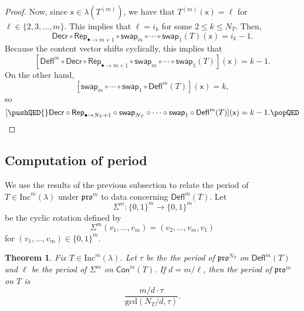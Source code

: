 \documentclass[12pt]{amsart}
\newcommand{\x}{\ensuremath{\mathsf{x}}}
\newtheorem{theorem}{Theorem}[section]
\theoremstyle{definition}
\theoremstyle{remark}
\numberwithin{equation}{section}
\newcommand{\inc}{\ensuremath{\mathrm{Inc}}}
\newcommand{\pro}{\mathfrak{pro}}
\newcommand{\swap}{\ensuremath{\mathsf{swap}}}
\newcommand{\decr}{\ensuremath{\mathsf{Decr}}}
\newcommand{\rep}{\ensuremath{\mathsf{Rep}}}
\newcommand{\deflate}{\ensuremath{\mathsf{Defl}}}
\newcommand{\content}{\ensuremath{\mathsf{Con}}}
\begin{document}
\begin{proof}
Now, since $\x \in \lambda(T^{(m)})$, we have that $T^{(m)}(\x) = \ell$ for $\ell \in \{2,3,\dots,m\}$. This implies that $\ell = i_k$ for some $2 \leq k \leq N_T$. Then, 
\[
\decr \circ \rep_{\bullet \to m+1} \circ \swap_m \circ \cdots \circ \swap_1 (T)(\x) = i_k-1.
\]
Because the content vector shifts cyclically, this implies that 
 \[
 [\deflate^m \circ \decr \circ \rep_{\bullet \rightarrow m+1} \circ \swap_m \circ \cdots \circ \swap_1 (T)](\x) = k-1.
 \]
  On the other hand, 
  \[
  [\swap_m \circ \cdots \circ \swap_1 \circ \deflate^m(T)](\x) = k,
  \]
   so 
   \[
   [ \pushQED{\qed} \decr \circ \rep_{\bullet \rightarrow N_T + 1} \circ \swap_{N_T} \circ \cdots \circ \swap_1 \circ  \deflate^m(T)](\x) = k-1. \qedhere \popQED \] \let\qed\relax
\end{proof}

\subsection{Computation of period}\label{sec:period} We use the results of the previous subsection to relate the period of $T \in \inc^m(\lambda)$ under $\pro^m$ to data concerning $\deflate^m(T)$. Let 
\[\Sigma^m : \lbrace 0,1\rbrace^m \rightarrow \lbrace 0,1\rbrace^m\]
 be the cyclic rotation defined by 
 \[
 \Sigma^m(v_1, \dots, v_m) = (v_2, \dots, v_m, v_1)
 \]
  for $(v_1, \dots, v_m) \in \lbrace 0,1 \rbrace^m$. 
  
\begin{theorem}\label{thm:periodthm}
Fix $T \in \inc^m(\lambda)$. Let $\tau$ be the the period of $\pro^{N_T}$ on $\deflate^m(T)$ and $\ell$ be the period of $\Sigma^m$ on $\content^m(T)$. If $d = m/\ell$, then the period of $\pro^m$ on $T$ is \[\frac{m/d \cdot \tau}{\mathrm{gcd}(N_T/d,\tau)}. \]
\end{theorem} 
    
\end{document}
